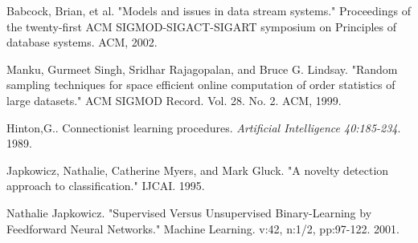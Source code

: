 \documentclass[conference]{IEEEtran}
\begin{document}
\begin{thebibliography}{9}
			Babcock, Brian, et al. "Models and issues in data stream systems." Proceedings of the twenty-first ACM SIGMOD-SIGACT-SIGART symposium on Principles of database systems. ACM, 2002.
			
			Manku, Gurmeet Singh, Sridhar Rajagopalan, and Bruce G. Lindsay. "Random sampling techniques for space efficient online computation of order statistics of large datasets." ACM SIGMOD Record. Vol. 28. No. 2. ACM, 1999.
			
			
			Hinton,G.. Connectionist learning procedures. \textit{Artificial Intelligence  40:185-234}. 1989. 
			
			Japkowicz, Nathalie, Catherine Myers, and Mark Gluck. "A novelty detection approach to classification." IJCAI. 1995.
			
			Nathalie Japkowicz. "Supervised Versus Unsupervised Binary-Learning by Feedforward Neural Networks." Machine Learning. v:42, n:1/2, pp:97-122. 2001.
			
			
			
			
			
			
			
			
			
			
			
			
			
		\end{thebibliography}
		
		
		
		
		
	
\end{document}
